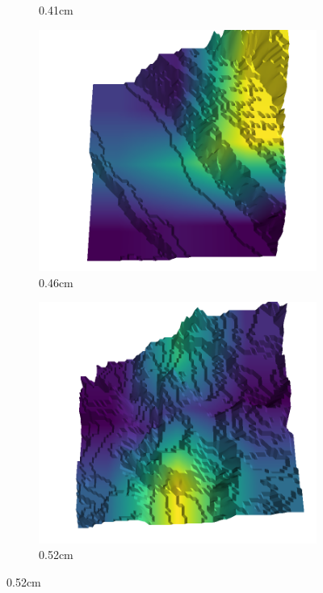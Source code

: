 \begin{figure}[H]
\begin{subfigure}[b]{0.192\linewidth}
    \caption{0.41cm}
    \label{fig : quarry-false_positive-17}
    \end{subfigure}
    \begin{subfigure}[b]{0.192\linewidth}
    \includegraphics[width=\linewidth]{../img/5/quarry/false_positive/46-patch-3d-majavi-colormap-216.png}
    \caption{0.46cm}
    \label{fig : quarry-false_positive-18}
    \end{subfigure}
    \begin{subfigure}[b]{0.192\linewidth}
    \includegraphics[width=\linewidth]{../img/5/quarry/false_positive/51-patch-3d-majavi-colormap-228.png}
    \caption{0.52cm}
    \label{fig : quarry-false_positive-19}
    \end{subfigure}
    \label{fig : quarry-false_positive}
    \end{figure}


% 